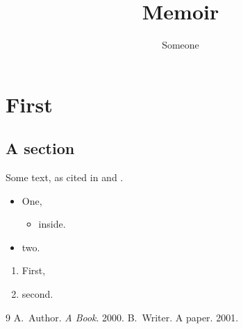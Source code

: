 \documentclass{memoir}
\title{Memoir}
\author{Someone}
\begin{document}
\maketitle
\tableofcontents
\chapter{First}
\section{A section}
Some text, as cited in \cite{book} and \cite{paper}.
\begin{itemize}
    \item One,
    \begin{itemize}
        \item inside.
    \end{itemize}
    \item two.
\end{itemize}
\begin{enumerate}
    \item First,
    \item second.
\end{enumerate}
\begin{thebibliography}{9}
 A.~Author. \emph{A Book}. 2000.
 B.~Writer. A paper. 2001.
\end{thebibliography}
\end{document}
